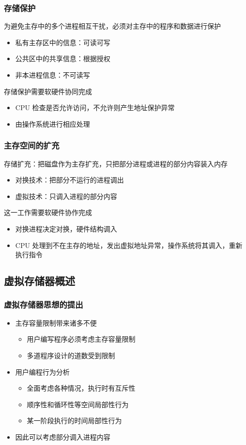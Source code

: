 \documentclass[cs4size,a4paper,10pt]{ctexart}
\begin{document}
	\subsubsection{存储保护}
	为避免主存中的多个进程相互干扰，必须对主存中的程序和数据进行保护
	\begin{itemize}
		\item 私有主存区中的信息：可读可写
		\item 公共区中的共享信息：根据授权
		\item 非本进程信息：不可读写
	\end{itemize}
	存储保护需要软硬件协同完成
	\begin{itemize}
		\item CPU 检查是否允许访问，不允许则产生地址保护异常
		\item 由操作系统进行相应处理
	\end{itemize}


	\subsubsection{主存空间的扩充}
	存储扩充：把磁盘作为主存扩充，只把部分进程或进程的部分内容装入内存
	\begin{itemize}
		\item 对换技术：把部分不运行的进程调出
		\item 虚拟技术：只调入进程的部分内容
	\end{itemize}
	这一工作需要软硬件协作完成
	\begin{itemize}
		\item 对换进程决定对换，硬件结构调入
		\item CPU 处理到不在主存的地址，发出虚拟地址异常，操作系统将其调入，重新执行指令
	\end{itemize}

	\subsection{虚拟存储器概述}
	\subsubsection{虚拟存储器思想的提出}
	\begin{itemize}
		\item 主存容量限制带来诸多不便
		\begin{itemize}
			\item 用户编写程序必须考虑主存容量限制
			\item 多道程序设计的道数受到限制
		\end{itemize}
		\item 用户编程行为分析
		\begin{itemize}
			\item 全面考虑各种情况，执行时有互斥性
			\item 顺序性和循环性等空间局部性行为
			\item 某一阶段执行的时间局部性行为
		\end{itemize}
		\item 因此可以考虑部分调入进程内容
	\end{itemize}
\end{document}
